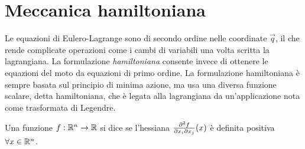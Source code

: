 \section{Meccanica hamiltoniana}
Le equazioni di Eulero-Lagrange sono di secondo ordine nelle coordinate $\vec{q}$, il che rende complicate operazioni come i cambi di variabili una volta scritta la lagrangiana. La formulazione \emph{hamiltoniana} consente invece di ottenere le equazioni del moto da equazioni di primo ordine. La formulazione hamiltoniana è sempre basata sul principio di minima azione, ma usa una diversa funzione scalare, detta hamiltoniana, che è legata alla lagrangiana da un'applicazione nota come trasformata di Legendre.

\begin{definition}
  Una funzione $f:\mathbb{R}^n \to \mathbb{R}$ si dice  se l'hessiana $\pdv{f}{x_i}{x_j}()(x)$ è definita positiva $\forall x \in \mathbb{R}^{n}$.
\end{definition}

